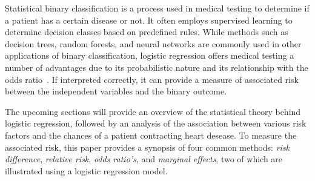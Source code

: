 Statistical binary classification is a process used in medical testing to determine if a patient has a certain disease or not.
It often employs supervised learning to determine decision classes based on predefined rules.
While methods such as decision trees, random forests, and neural networks are commonly used in other applications of binary classification, logistic regression offers medical testing a number of advantages due to its probabilistic nature and its relationship with the odds ratio~\citep{Schober2021-vs}. 
If interpreted correctly, it can provide a measure of associated risk between the independent variables and the binary outcome.

The upcoming sections will provide an overview of the statistical theory behind logistic regression, followed by an analysis of the association between various risk factors and the chances of a patient contracting heart desease.
To measure the associated risk, this paper provides a synopsis of four common methods: \emph{risk difference}, \emph{relative risk}, \emph{odds ratio's}, and \emph{marginal effects}, two of which are illustrated using a logistic regression model.